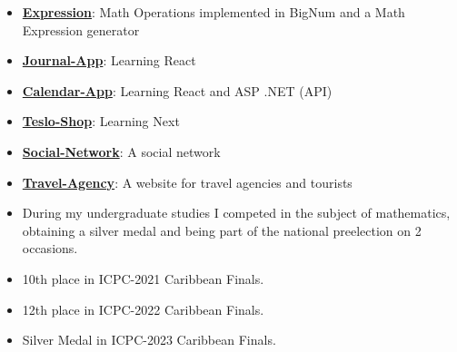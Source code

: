 \documentclass[8pt]{developercv} %
\begin{document}
\begin{minipage}[t]{0.45\textwidth}
	\vspace{-\baselineskip} %
	
	
	\begin{itemize}
		\item {\href{https://github.com/raudel25/Expression}{\textbf{Expression}}: Math Operations implemented in BigNum and a Math Expression generator}
		\item {\href{https://github.com/raudel25/Journal-App}{\textbf{Journal-App}}: Learning React}
		\item {\href{https://github.com/raudel25/Calendar-App}{\textbf{Calendar-App}}: Learning React and ASP .NET (API)}
		\item {\href{https://github.com/raudel25/Calendar-App}{\textbf{Teslo-Shop}}: Learning Next}
		\item {\href{https://github.com/raudel25/social-network}{\textbf{Social-Network}}: A social network}
		\item {\href{https://github.com/Jara-Devs/Travel-Agency}{\textbf{Travel-Agency}}: A website for travel agencies and tourists}
	\end{itemize}
\end{minipage}
\hfill
\begin{minipage}[t]{0.45\textwidth}
	\vspace{-\baselineskip} %
	
	
	\begin{itemize}
		\item During my undergraduate studies I competed in the subject of mathematics, obtaining a
		      silver medal and being part of the national preelection on 2 occasions.
		\item 10th place in ICPC-2021 Caribbean Finals.
		\item 12th place in ICPC-2022 Caribbean Finals.
		\item Silver Medal in ICPC-2023 Caribbean Finals.
	\end{itemize}
	
\end{minipage}



\end{document}
